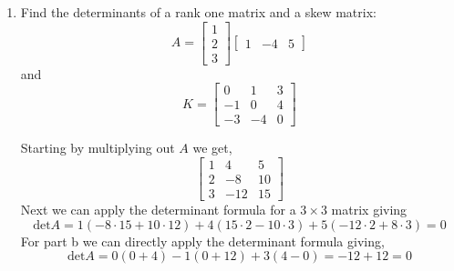 \begin{enumerate}[label=\arabic*.]
    \item Find the determinants of a rank one matrix and a skew matrix:
        \begin{equation}
            A = 
            \begin{bmatrix}
                1   \\
                2   \\
                3
            \end{bmatrix}
            \begin{bmatrix}
                1       &   -4   &   5
            \end{bmatrix}
        \end{equation}
        and 
        \begin{equation}
            K = 
            \begin{bmatrix}
                0       &       1       &       3   \\
                -1      &       0       &       4   \\
               -3       &       -4      &       0
            \end{bmatrix}
        \end{equation}
        \begin{mdframed}[style=MyFrame]
           Starting by multiplying out $A$ we get,
            \begin{equation}
                \begin{bmatrix}
                    1       &       4       &       5   \\
                    2       &       -8      &       10  \\
                    3       &       -12     &       15
                \end{bmatrix}
            \end{equation}
            Next we can apply the determinant formula for a $3 \times 3$
            matrix giving
            \begin{equation}
                \text{det}A = 
                    1(-8\cdot15 + 10\cdot 12) +
                    4(15\cdot2 - 10\cdot3) + 
                    5(-12 \cdot 2 + 8\cdot3)
                    = 0
            \end{equation}
            For part b we can directly apply the determinant formula
            giving,
            \begin{equation}
                \text{det}A = 
                    0(0+4) - 1(0+12) + 3(4-0) =
                    -12 +12 = 0
            \end{equation}
        \end{mdframed}
\end{enumerate}
